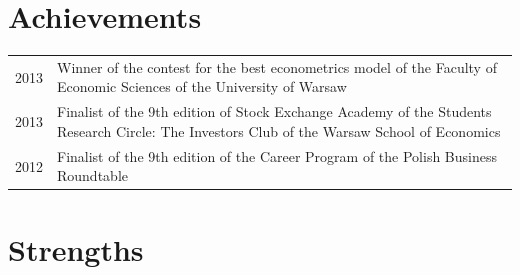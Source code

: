 \documentclass{cls/gml_cv_sets}
\begin{document}
\begin{paracol}{2}
\begin{minipage}[t]{0.6\textwidth}
    \section{Achievements}
    \begin{tabular}{>{\footnotesize}r >{\footnotesize}p{}}
        2013 & Winner of the contest for the best econometrics model of the 
        Faculty of Economic Sciences of the University of Warsaw \\
        2013 & Finalist of the 9th edition of Stock Exchange Academy of the 
        Students Research Circle: The Investors Club of the Warsaw School of 
        Economics \\
        2012 & Finalist of the 9th edition of the Career Program of the 
        Polish Business Roundtable
    \end{tabular}
\end{minipage}

\section{Strengths}
\begin{center}
\end{center}

\clearpage
\end{paracol}
\end{document}
